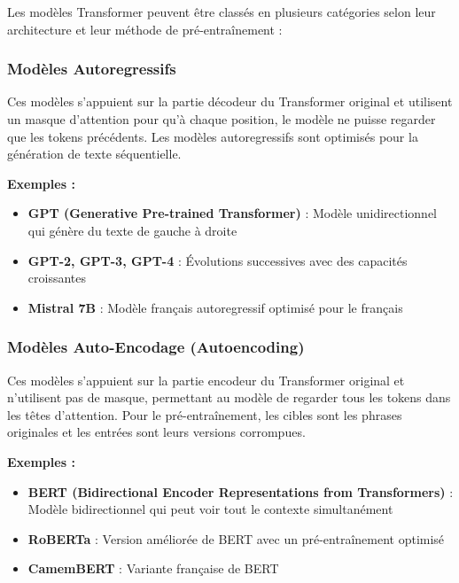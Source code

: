 Les modèles Transformer peuvent être classés en plusieurs catégories selon leur architecture et leur méthode de pré-entraînement :

\subsubsection{Modèles Autoregressifs}

Ces modèles s'appuient sur la partie décodeur du Transformer original et utilisent un masque d'attention pour qu'à chaque position, le modèle ne puisse regarder que les tokens précédents. Les modèles autoregressifs sont optimisés pour la génération de texte séquentielle.

\textbf{Exemples :}
\begin{itemize}
    \item \textbf{GPT (Generative Pre-trained Transformer)} \cite{radford2018improving} : Modèle unidirectionnel qui génère du texte de gauche à droite
    \item \textbf{GPT-2, GPT-3, GPT-4} \cite{radford2019language, brown2020language} : Évolutions successives avec des capacités croissantes
    \item \textbf{Mistral 7B} \cite{jiang2023mistral} : Modèle français autoregressif optimisé pour le français
\end{itemize}

\subsubsection{Modèles Auto-Encodage (Autoencoding)}

Ces modèles s'appuient sur la partie encodeur du Transformer original et n'utilisent pas de masque, permettant au modèle de regarder tous les tokens dans les têtes d'attention. Pour le pré-entraînement, les cibles sont les phrases originales et les entrées sont leurs versions corrompues.

\textbf{Exemples :}
\begin{itemize}
    \item \textbf{BERT (Bidirectional Encoder Representations from Transformers)} \cite{devlin2018bert} : Modèle bidirectionnel qui peut voir tout le contexte simultanément
    \item \textbf{RoBERTa} : Version améliorée de BERT avec un pré-entraînement optimisé
    \item \textbf{CamemBERT} \cite{martin2020camembert} : Variante française de BERT
\end{itemize}

